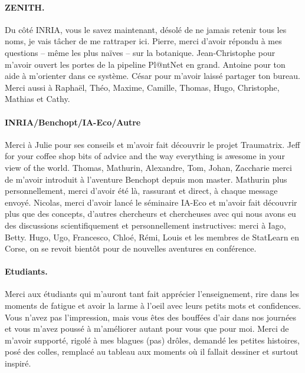 \paragraph*{ZENITH.}
Du côté INRIA, vous le savez maintenant, désolé de ne jamais retenir tous les noms, je vais tâcher de me rattraper ici.
Pierre, merci d'avoir répondu à mes questions -- même les plus naïves -- sur la botanique. Jean-Christophe pour m'avoir ouvert les portes de la pipeline Pl@ntNet en grand. Antoine pour ton aide à m'orienter dans ce système.
César pour m'avoir laissé partager ton bureau.
Merci aussi à Raphaël, Théo, Maxime, Camille, Thomas, Hugo, Christophe, Mathias et Cathy.

\medskip

\paragraph*{INRIA/Benchopt/IA-Eco/Autre}
Merci à Julie pour ses conseils et m'avoir fait découvrir le projet Traumatrix.
Jeff for your coffee shop bits of advice and the way everything is awesome in your view of the world.
Thomas, Mathurin, Alexandre, Tom, Johan, Zaccharie merci de m'avoir introduit à l'aventure Benchopt depuis mon master.
Mathurin plus personnellement, merci d'avoir été là, rassurant et direct, à chaque message envoyé.
Nicolas, merci d'avoir lancé le séminaire IA-Eco et m'avoir fait découvrir plus que des concepts, d'autres chercheurs et chercheuses avec qui nous avons eu des discussions scientifiquement et personnellement instructives: merci à Iago, Betty.
Hugo, Ugo, Francesco, Chloé, Rémi, Louis et les membres de StatLearn en Corse, on se revoit bientôt pour de nouvelles aventures en conférence.

\medskip

\paragraph*{Etudiants.}
Merci aux étudiants qui m'auront tant fait apprécier l'enseignement, rire dans les moments de fatigue et avoir la larme à l'oeil avec leurs petits mots et confidences.
Vous n'avez pas l'impression, mais vous êtes des bouffées d'air dans nos journées et vous m'avez poussé à m'améliorer autant pour vous que pour moi.
Merci de m'avoir supporté, rigolé à mes blagues (pas) drôles, demandé les petites histoires, posé des colles, remplacé au tableau aux moments où il fallait dessiner et surtout inspiré.

